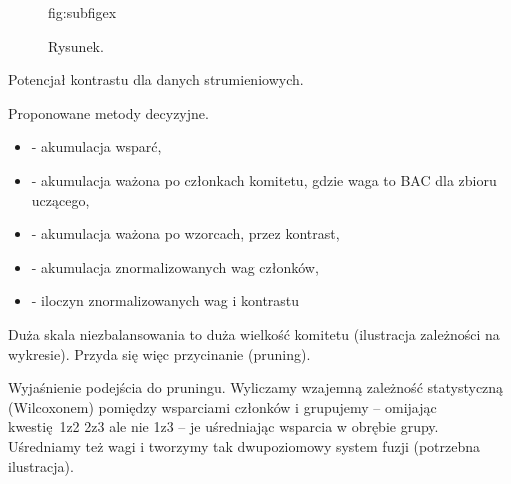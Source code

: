\documentclass[pmlr]{jmlr}
\begin{document}
\begin{figure}[!h]
\floatconts
  {fig:subfigex}
  {\caption{Rysunek.}}
  {%
  }
\end{figure}

Potencjał kontrastu dla danych strumieniowych.

Proponowane metody decyzyjne.

\begin{itemize}
	\item - akumulacja wsparć,
	\item - akumulacja ważona po członkach komitetu, gdzie waga to BAC dla zbioru uczącego,
	\item - akumulacja ważona po wzorcach, przez kontrast,
	\item - akumulacja znormalizowanych wag członków,
	\item - iloczyn znormalizowanych wag i kontrastu
\end{itemize}

Duża skala niezbalansowania to duża wielkość komitetu (ilustracja zależności na wykresie). Przyda się więc przycinanie (pruning).

Wyjaśnienie podejścia do pruningu. Wyliczamy wzajemną zależność statystyczną (Wilcoxonem) pomiędzy wsparciami członków i grupujemy -- omijając kwestię 1z2 2z3 ale nie 1z3 -- je uśredniając wsparcia w obrębie grupy. Uśredniamy też wagi i tworzymy tak dwupoziomowy system fuzji (potrzebna ilustracja).
\end{document}
